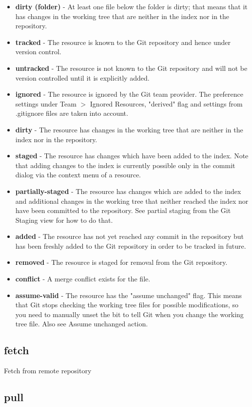 \documentclass{scrreprt}
\newcounter{myCounter}[subsubsection]
\newcommand{\layerThree}[1]{\subsection{#1} \setcounter{myCounter}{0}}
\begin{document}
\begin{itemize}
  \item \textbf{dirty (folder)} - At least one file below the folder is dirty; that
  means that it has changes in the working tree that are neither in the index nor in the repository.
  \item \textbf{tracked} - The resource is known to the Git repository and hence
  under version control.
  \item \textbf{untracked} - The resource is not known to the Git repository
  and will not be version controlled until it is explicitly added.
  \item \textbf{ignored} - The resource is ignored by the Git team provider. The
  preference settings under Team $>$ Ignored Resources, "derived" flag and
  settings from .gitignore files are taken into account.
  \item \textbf{dirty} - The resource has changes in the working tree that are
  neither in the index nor in the repository.
  \item \textbf{staged} - The resource has changes which have been added to the
  index. Note that adding changes to the index is currently possible only in the commit dialog via the context menu of a resource.
  \item \textbf{partially-staged} - The resource has changes which are added to the
  index and additional changes in the working tree that neither reached the index nor have been committed to the repository. See partial staging from the Git Staging view for how to do that.
  \item \textbf{added} - The resource has not yet reached any commit in the
  repository but has been freshly added to the Git repository in order to be tracked in future.
  \item \textbf{removed} - The resource is staged for removal from the Git
  repository.
  \item \textbf{conflict} - A merge conflict exists for the file.
  \item \textbf{assume-valid} - The resource has the "assume unchanged" flag. This
  means that Git stops checking the working tree files for possible modifications, so you need to manually unset the bit to tell Git when you change the working tree file. Also see Assume unchanged action.
\end{itemize}

\layerThree{fetch}

Fetch from remote repository

\layerThree{pull}
\end{document}
